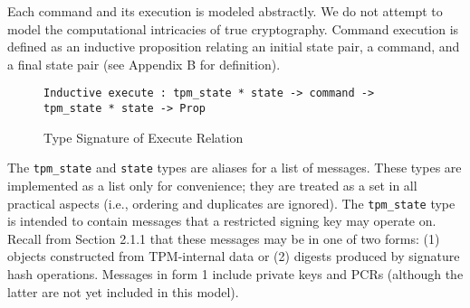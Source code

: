 Each command and its execution is modeled abstractly. We do not attempt to model the computational intricacies of true cryptography. Command execution is defined as an inductive proposition relating an initial state pair, a command, and a final state pair (see Appendix B for definition). 
\begin{figure}[h]
\begin{lstlisting}[language=Coq]
Inductive execute : tpm_state * state -> command -> tpm_state * state -> Prop
\end{lstlisting}
\caption{Type Signature of Execute Relation}
\end{figure}
The \verb|tpm_state| and \verb|state| types are aliases for a list of messages. These types are implemented as a list only for convenience; they are treated as a set in all practical aspects (i.e., ordering and duplicates are ignored). The \verb|tpm_state| type is intended to contain messages that a restricted signing key may operate on. Recall from Section 2.1.1 that these messages may be in one of two forms: (1) objects constructed from TPM-internal data or (2) digests produced by signature hash operations. Messages in form 1 include private keys and PCRs (although the latter are not yet included in this model). 

